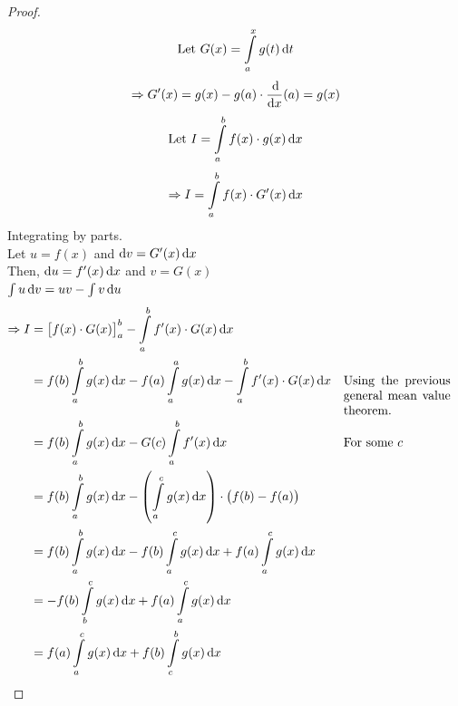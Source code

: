 \documentclass[14]{article}
\theoremstyle{definition}
\theoremstyle{case}
\begin{document}
\begin{proof}
\[\text{Let } G(x) = \int\limits_a^x g(t) \dif t\]
\[\Rightarrow G'(x) = g(x) - g(a)\cdot \dfrac{\dif}{\dif x}(a) = g(x)\]
\[\text{Let }I = \int\limits_a^b f(x) \cdot g(x) \dif x\]
\[\Rightarrow I = \int\limits_a^b f(x) \cdot G'(x) \dif x\]
Integrating by parts.\\
Let $u = f(x)$ and $\dif v = G'(x) \dif x$\\
Then, $\dif u = f'(x) \dif x$ and $v = G(x)$\\
$\int u \dif v = uv - \int v \dif u$
\begin{align*}
\Rightarrow I &= \left[ f(x) \cdot G(x) \right]_a^b - \int\limits_a^b f'(x) \cdot G(x) \dif x\\
&= f(b) \int\limits_a^b g(x) \dif x - f(a) \int\limits_a^a g(x) \dif x - \int\limits_a^b f'(x) \cdot G(x) \dif x && \parbox[t]{3cm}{Using the previous general mean value theorem.}\\
&= f(b) \int\limits_a^b g(x) \dif x - G(c) \int\limits_a^b f'(x) \dif x && \text{For some $c$}\\
&= f(b) \int\limits_a^b g(x) \dif x - \left(\int\limits_a^c g(x) \dif x \right)\cdot\left(f(b) - f(a) \right)\\
&= f(b) \int\limits_a^b g(x) \dif x - f(b) \int\limits_a^c g(x) \dif x + f(a) \int\limits_a^c g(x) \dif x\\
&= - f(b) \int\limits_b^c g(x) \dif x + f(a) \int\limits_a^c g(x) \dif x\\
&= f(a) \int\limits_a^c g(x) \dif x + f(b) \int\limits_c^b g(x) \dif x
\end{align*}
\end{proof}
\pagebreak
\end{document}
